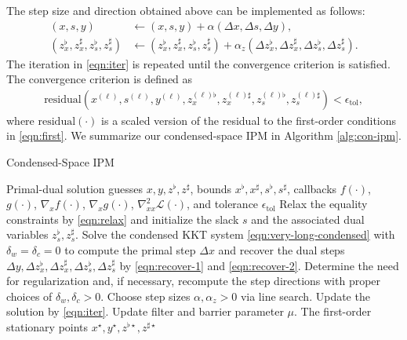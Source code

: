 \documentclass{IEEEtran4PSCC} %
\begin{document}
The step size and direction obtained above can be implemented as follows:
\begin{align}
  (x,s,y) &\leftarrow (x,s,y)+ \alpha (\Delta x, \Delta s, \Delta y),\label{eqn:iter}\\\nonumber
  (z_x^\flat, z_x^\sharp, z_s^\flat, z_s^\sharp) &\leftarrow (z_x^\flat, z_x^\sharp, z_s^\flat, z_s^\sharp) + \alpha_z (\Delta z_x^\flat, \Delta z_x^\sharp, \Delta z_s^\flat, \Delta z_s^\sharp).
\end{align}
The iteration in \eqref{eqn:iter} is repeated until the convergence
criterion is satisfied. The convergence criterion is defined as
\begin{align}\label{eqn:criteria}
\text{residual}(x^{(\ell)}, s^{(\ell)}, y^{(\ell)},
z^{(\ell)\flat}_x, z^{(\ell)\sharp}_x, z^{(\ell)\flat}_s,
z^{(\ell)\sharp}_s) <\epsilon_{\text{tol}},
\end{align}
where
$\text{residual}(\cdot)$ is a scaled version of the residual to the
first-order conditions in \eqref{eqn:first}. We summarize our
condensed-space IPM in Algorithm \ref{alg:con-ipm}.

\begin{algorithm}[t]
  \caption{Condensed-Space IPM}
  \label{alg:con-ipm}
  \begin{algorithmic}[1]
    \REQUIRE Primal-dual solution guesses $x,y, z^\flat, z^\sharp$, bounds $x^\flat,x^\sharp, s^\flat, s^\sharp$, callbacks $f(\cdot)$, $g(\cdot)$, $\nabla_x f(\cdot)$, $\nabla_x g(\cdot)$, $\nabla^2_{xx} \mathcal{L}(\cdot)$, and tolerance $\epsilon_{\text{tol}}$
    \STATE Relax the equality constraints by \eqref{eqn:relax} and initialize the slack $s$ and the associated dual variables $z^\flat_s, z^\sharp_s$.
    \STATE Solve the condensed KKT system \eqref{eqn:very-long-condensed} with $\delta_w=\delta_c=0$ to compute the primal step $\Delta x$ and recover the dual steps $\Delta y, \Delta z_x^\flat, \Delta z_x^\sharp, \Delta z_s^\flat, \Delta z_s^\sharp$ by \eqref{eqn:recover-1} and \eqref{eqn:recover-2}.
    \STATE Determine the need for regularization and, if necessary, recompute the step directions with proper choices of $\delta_w,\delta_c>0$.
    \STATE Choose step sizes $\alpha,\alpha_z>0$ via line search.
    \STATE Update the solution by \eqref{eqn:iter}.
    \STATE Update filter and barrier parameter $\mu$.
    \ENDWHILE
    \RETURN The first-order stationary points $x^\star,y^\star, z^{\flat\star}, z^{\sharp\star}$
  \end{algorithmic}
\end{algorithm}
\end{document}
